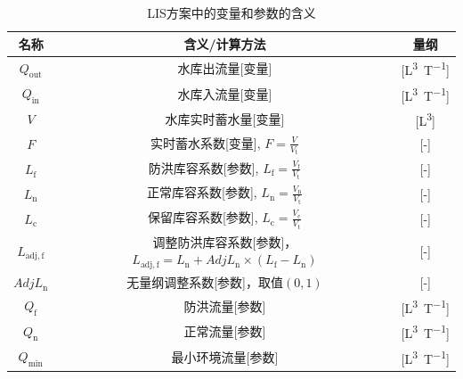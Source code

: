 \begin{table}[htbp]
  \centering
  \caption{LIS方案中的变量和参数的含义}
  \label{tab:LIS方案变量参数表}
  \begin{tabular}{ccc}
    \toprule
    名称                 & 含义/计算方法                                                               & 量纲                \\ \midrule
    $Q_{\mathrm{out}}$   & 水库出流量[变量]                                                            & [\unit{L^3.T^{-1}}] \\
    $Q_{\mathrm{in}}$    & 水库入流量[变量]                                                            & [\unit{L^3.T^{-1}}] \\
    $V$                  & 水库实时蓄水量[变量]                                                        & [\unit{L^3}]        \\
    $F$                  & 实时蓄水系数[变量], $F=\frac{V}{V_{\mathrm{t}}}$                            & [-]                 \\
    $L_{\mathrm{f}}$     & 防洪库容系数[参数], $L_{\mathrm{f}}=\frac{V_{\mathrm{f}}}{V_{\mathrm{t}}}$  & [-]                 \\
    $L_{\mathrm{n}}$     & 正常库容系数[参数], $L_{\mathrm{n}}=\frac{V_{\mathrm{n}}}{V_{\mathrm{t}}}$  & [-]                 \\
    $L_{\mathrm{c}}$     & 保留库容系数[参数], $L_{\mathrm{c}}=\frac{V_{\mathrm{c}}}{V_{\mathrm{t}}}$  & [-]                 \\
    $L_{\mathrm{adj,f}}$ & \makecell{调整防洪库容系数[参数]，                                         \\
    $L_{\mathrm{adj,f}} = L_{\mathrm{n}}+AdjL_{\mathrm{n}} \times \left(L_{\mathrm{f}}-L_{\mathrm{n}}\right)$}
                         & [-]                                                                        \\
    $AdjL_{\mathrm{n}}$  & 无量纲调整系数[参数]，取值$\left(0,1\right)$                                & [-]                 \\
    $Q_{\mathrm{f}}$     & 防洪流量[参数]                                                              & [\unit{L^3.T^{-1}}] \\
    $Q_{\mathrm{n}}$     & 正常流量[参数]                                                              & [\unit{L^3.T^{-1}}] \\
    $Q_{\mathrm{min}}$   & 最小环境流量[参数]                                                          & [\unit{L^3.T^{-1}}] \\

\end{tabular}
\end{table}
